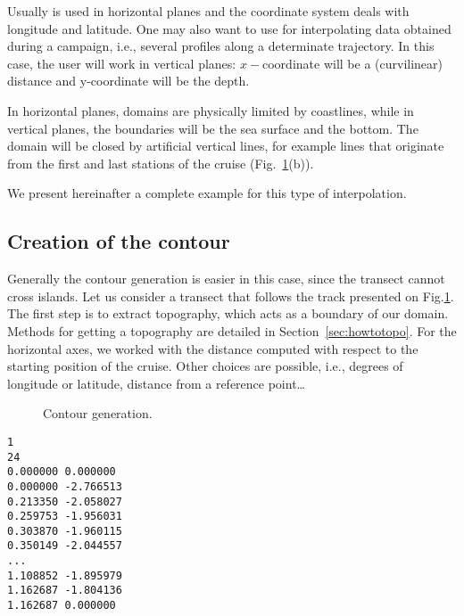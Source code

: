 Usually \diva is used in horizontal planes and the coordinate system deals with longitude and latitude. One may also want to use \diva for interpolating data obtained during a campaign, i.e., several profiles along a determinate trajectory. In this case, the user will work in vertical planes: $x-$coordinate will be a (curvilinear) distance and y-coordinate will be the depth.

In horizontal planes, domains are physically limited by coastlines, while in vertical planes, the boundaries will be the sea surface and the bottom. The domain will be closed by artificial vertical lines, for example lines that originate from the first and last stations of the cruise (Fig.~\ref{fig:data}(b)).

We present hereinafter a complete example for this type of interpolation.


\subsection{Creation of the contour}

Generally the contour generation is easier in this case, since the transect cannot cross islands. Let us consider a transect that follows the track presented on Fig.\ref{fig:data}. The first step is to extract topography, which acts as a boundary of our domain. Methods for getting a topography are detailed in Section~\ref{sec:howtotopo}. For the horizontal axes, we worked with the distance computed with respect to the starting position of the cruise. Other choices are possible, i.e., degrees of longitude or latitude, distance from a reference point\ldots

\begin{figure}[htpb]
\centering
{}
\caption{Contour generation.\label{fig:data}}
\end{figure}


\begin{exfile}
\begin{footnotesize}
\begin{verbatim}
1 
24 
0.000000 0.000000 
0.000000 -2.766513 
0.213350 -2.058027 
0.259753 -1.956031 
0.303870 -1.960115 
0.350149 -2.044557 
...
1.108852 -1.895979 
1.162687 -1.804136 
1.162687 0.000000 

\end{verbatim}
\end{footnotesize}
\caption{Contour file of Fig.~\ref{fig:data}(b).\label{exfile:contour}}
\end{exfile}


